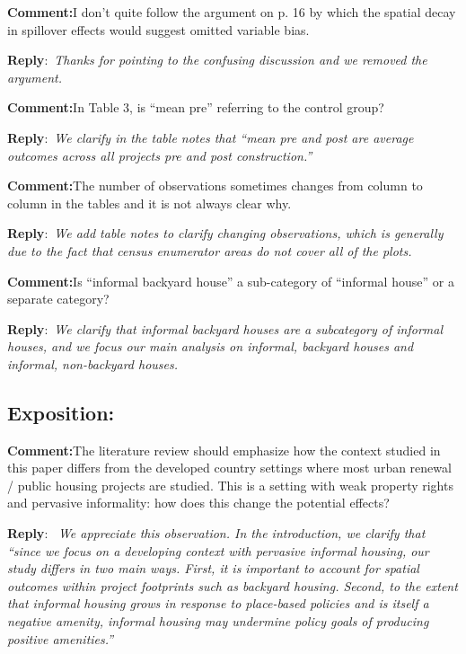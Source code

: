 \documentclass{article}
\newcounter{reviewer}
\newcounter{point}[reviewer]
\newcommand{\reply}{\medskip \noindent \textbf{Reply}:\ \textit }
\newcommand{\sr}{\begin{minipage}{\dimexpr\textwidth-3cm}}
\newcommand{\er}{\end{minipage}}
\newcommand{\cc}{\medskip \noindent \textbf{Comment:}\hspace{2em}}
\begin{document}
\cc I don’t quite follow the argument on p. 16 by which the spatial decay in spillover effects would suggest omitted variable bias.

\sr
\reply{Thanks for pointing to the confusing discussion and we removed the argument.}\\
\er

\cc In Table 3, is “mean pre” referring to the control group?

\sr
\reply{We clarify in the table notes that ``mean pre and post are average outcomes  across all projects pre and post construction.''}\\
\er

\cc The number of observations sometimes changes from column to column in the tables and it is not always clear why.

\sr
\reply{We add table notes to clarify changing observations, which is generally due to the fact that census enumerator areas do not cover all of the plots. }\\
\er

\cc Is “informal backyard house” a sub-category of “informal house” or a separate category?

\sr
\reply{We clarify that informal backyard houses are a subcategory of informal houses, and we focus our main analysis on informal, backyard houses and informal, non-backyard houses.}\\
\er

\subsection{Exposition:}

\cc The literature review should emphasize how the context studied in this paper differs from the developed country settings where most urban renewal / public housing projects are studied. This is a setting with weak property rights and pervasive informality: how does this change the potential effects?

\sr
\reply{ We appreciate this observation.  In the introduction, we clarify that ``since we focus on a developing context with pervasive informal housing, our study differs in two main ways.  First, it is important to account for spatial outcomes within project footprints such as backyard housing.  Second, to the extent that informal housing grows in response to place-based policies and is itself a negative amenity, informal housing may undermine policy goals of producing positive amenities.'' }\\
\er
\end{document}
